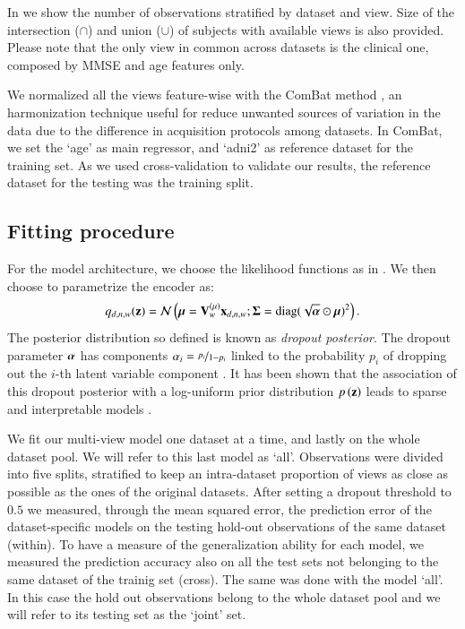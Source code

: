 In  we show the number of observations stratified by dataset and view.
Size of the intersection ($\cap$) and union ($\cup$) of subjects with available views is also provided.
Please note that the only view in common across datasets is the clinical one, composed by MMSE and age features only.

We normalized all the views feature-wise with the ComBat method \citep{Fortin2018}, an harmonization technique useful for reduce unwanted sources of variation in the data due to the difference in acquisition protocols among datasets.
In ComBat, we set the `age' as main regressor, and `adni2' as reference dataset for the training set.
As we used cross-validation to validate our results, the reference dataset for the testing  was the training split.

\subsection{Fitting procedure}
For the model architecture, we choose the likelihood functions as in .
We then choose to parametrize the encoder as:
\begin{equation}
\label{eq:dropout_posterior}
    q_{d,n,w}(\mathbf{z}) = \mathcal{N}\left(\boldsymbol{\mu} = \mathbf{V}_w^{(\mu)} \mathbf{x}_{d,n,w};\boldsymbol{\Sigma} = \text{diag}(\sqrt{\boldsymbol{\alpha}} \odot \boldsymbol{\mu})^2\right).
\end{equation}
The posterior distribution so defined is known as \textit{dropout posterior}.
The dropout parameter $\boldsymbol{\alpha}$ has components $\alpha_i = \nicefrac{p_i}{1-p_i}$ linked to the probability $p_i$ of dropping out the $i$-th latent variable component \cite{Wang2013}.
It has been shown that the association of this dropout posterior with a log-uniform prior distribution $p\left(\mathbf{z}\right)$ leads to sparse and interpretable models \cite{Antelmi2019,Molchanov2017}.

We fit our multi-view model one dataset at a time, and lastly on the whole dataset pool.
We will refer to this last model as `all'.
Observations were divided into five splits, stratified to keep an intra-dataset proportion of views as close as possible as the ones of the original datasets.
After setting a dropout threshold to $0.5$ we measured, through the mean squared error, the prediction error of the dataset-specific models on the testing hold-out observations of the same dataset (within).
To have a measure of the generalization ability for each model, we measured the prediction accuracy also on all the test sets not belonging to the same dataset of the trainig set (cross).
The same was done with the model `all'.
In this case the hold out observations belong to the whole dataset pool and we will refer to its testing set as the `joint' set.

